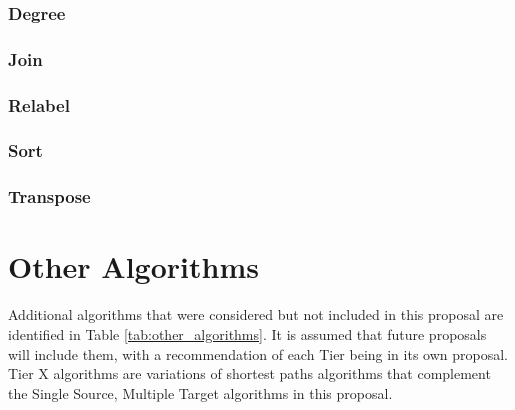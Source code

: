 \subsection{Degree}

\subsection{Join}

\subsection{Relabel}

\subsection{Sort}

\subsection{Transpose}




\chapter{Other Algorithms}

Additional algorithms that were considered but not included in this proposal are identified in Table \ref{tab:other_algorithms}. 
It is assumed that future proposals will include them, with a recommendation of each Tier being in its own proposal.
Tier X algorithms are variations of shortest paths algorithms that complement the Single Source, Multiple Target algorithms 
in this proposal.

